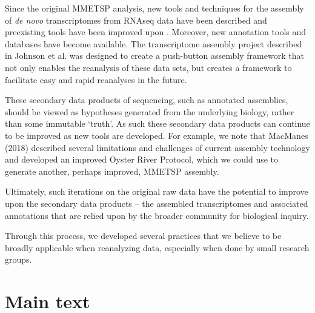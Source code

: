 \documentclass[12pt]{article}
\begin{document}
Since the original MMETSP analysis, new tools and techniques for the assembly of {\em de novo} transcriptomes from RNAseq data have been described and preexisting tools have been improved upon \cite{Grabherr2011}. Moreover, new annotation tools and databases have become available. The transcriptome assembly project described in Johnson et al. \cite{Cohen2017@@@} was designed to create a push-button assembly framework that not only enables the reanalysis of these data sets, but creates a framework to facilitate easy and rapid reanalyses in the future.

These secondary data products of sequencing, such as annotated
assemblies, should be viewed as hypotheses generated from the
underlying biology, rather than some immutable `truth'. As such these
secondary data products can continue to be improved as new tools are
developed.  For example, we note that MacManes (2018) described several
limitations and challenges of current assembly technology and developed
an improved Oyster River Protocol, which we could use to generate another,
perhaps improved, MMETSP assembly.

Ultimately, such iterations on the original raw data have the
potential to improve upon the secondary data products -- the assembled
transcriptomes and associated annotations that are relied upon by the
broader community for biological inquiry.

Through this process, we developed several practices that we believe
to be broadly applicable when reanalyzing data, especially when done
by small research groups.


\section{Main text}
\end{document}
